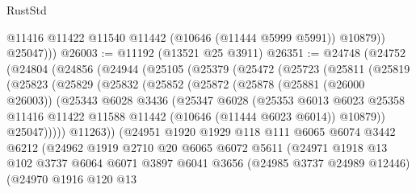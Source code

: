 \begin{lexlean}{RustStd}
\begin{coremodule}
              @11416
              @11422
              @11540
              @11442
              (@10646 (@11444 @5999 @5991))
              @10879))
          @25047)))
@26003 := @11192 (@13521 @25 @3911)
@26351 := @24748
    (@24752
      (@24804
        (@24856
          (@24944
            (@25105
              (@25379
                (@25472
                  (@25723
                    (@25811
                      (@25819
                        (@25823
                          (@25829
                            (@25832
                              (@25852
                                (@25872
                                  (@25878
                                    (@25881 (@26000 @26003))
                                    (@25343
                                      @6028
                                      @3436
                                      (@25347
                                        @6028
                                        (@25353
                                          @6013
                                          @6023
                                          @25358
                                          @11416
                                          @11422
                                          @11588
                                          @11442
                                          (@10646 (@11444 @6023 @6014))
                                          @10879))
                                      @25047)))))
                            @11263))
                        (@24951
                          @1920
                          @1929
                          @118
                          @111
                          @6065
                          @6074
                          @3442
                          @6212
                          (@24962
                            @1919
                            @2710
                            @20
                            @6065
                            @6072
                            @5611
                            (@24971
                              @1918
                              @13
                              @102
                              @3737
                              @6064
                              @6071
                              @3897
                              @6041
                              @3656
                              (@24985 @3737 @24989 @12446)
                              (@24970
                                @1916
                                @120
                                @13

\end{coremodule}
\end{lexlean}
